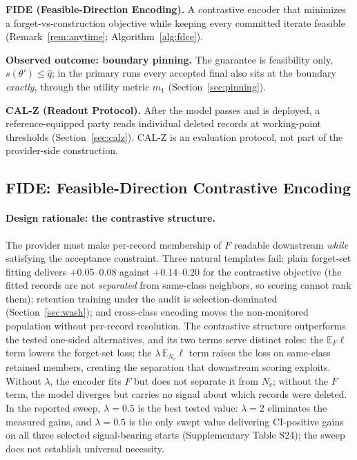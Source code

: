 \documentclass[lettersize,journal]{IEEEtran}
\begin{document}
\textbf{FIDE (Feasible-Direction Encoding).} A contrastive
encoder that minimizes a forget-vs-construction objective
while keeping every committed iterate feasible
(Remark~\ref{rem:anytime}; Algorithm~\ref{alg:fdce}).

\textbf{Observed outcome: boundary pinning.} The guarantee is
feasibility only, $s(\theta') \le \hat q$; in the primary runs
every accepted final also sits at the boundary \emph{exactly},
through the utility metric $m_1$
(Section~\ref{sec:pinning}).

\textbf{CAL-Z (Readout Protocol).} After the model passes and
is deployed, a reference-equipped party reads individual
deleted records at working-point thresholds
(Section~\ref{sec:calz}). CAL-Z is an evaluation protocol, not
part of the provider-side construction.



\subsection{FIDE: Feasible-Direction Contrastive Encoding}
\label{sec:fide}

\paragraph*{Design rationale: the contrastive structure.}
The provider must make per-record membership of $F$ readable
downstream \emph{while} satisfying the acceptance constraint.
Three natural templates fail: plain forget-set fitting
delivers $+0.05$--$0.08$ against $+0.14$--$0.20$ for the
contrastive objective (the fitted records are not
\emph{separated} from same-class neighbors, so scoring cannot
rank them); retention training under the audit is
selection-dominated (Section~\ref{sec:wash}); and cross-class
encoding moves the non-monitored population without
per-record resolution. The contrastive structure outperforms
the tested one-sided alternatives, and its two terms serve
distinct roles: the $\mathbb{E}_F \ell$ term lowers the
forget-set loss; the $\lambda\,\mathbb{E}_{N_c}\ell$ term
raises the loss on same-class retained members, creating the
separation that downstream scoring exploits. Without $\lambda$,
the encoder fits $F$ but does not separate it from $N_c$;
without the $F$ term, the model diverges but carries no signal
about which records were deleted. In the reported sweep, $\lambda{=}0.5$ is the best tested
value: $\lambda{=}2$ eliminates the measured gains, and
$\lambda{=}0.5$ is the only swept value delivering CI-positive
gains on all three selected signal-bearing starts
(Supplementary Table S24); the sweep does not establish
universal necessity.
\end{document}
